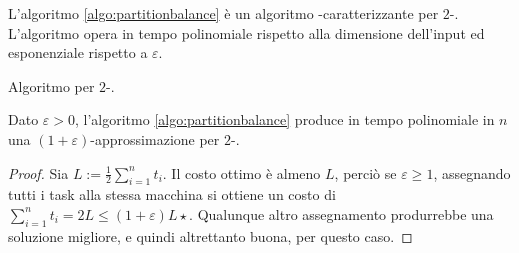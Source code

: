 L'algoritmo \ref{algo:partitionbalance} è un algoritmo \PTAS-caratterizzante per $2$-\LoadBalancing.
L'algoritmo opera in tempo polinomiale rispetto alla dimensione dell'input ed esponenziale rispetto a $\varepsilon$.

\begin{algorithm}
	\caption{Algoritmo \PTAS per $2$-\LoadBalancing.}
	\label{algo:partitionbalance}
	
\end{algorithm}

\begin{theorem}
	Dato $\varepsilon>0$, l'algoritmo \ref{algo:partitionbalance} produce in tempo polinomiale in $n$ una $(1+\varepsilon)$-approssimazione per $2$-\LoadBalancing.
\end{theorem}
\begin{proof}
	Sia $L:=\frac12\sum_{i=1}^n t_i$.
	Il costo ottimo è almeno $L$, perciò se $\varepsilon\geq1$, assegnando tutti i task alla stessa macchina si ottiene un costo di $\sum_{i=1}^n t_i=2L\leq(1+\varepsilon)L\star$. Qualunque altro assegnamento produrrebbe una soluzione migliore, e quindi altrettanto buona, per questo caso.


\end{proof}

